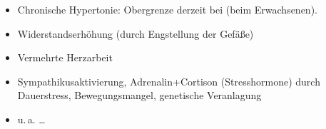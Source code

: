 \begin{itemize}
  \item Chronische Hypertonie: Obergrenze derzeit bei  (beim
  Erwachsenen).
\end{itemize}


{
\begin{itemize}
  \item Widerstandserhöhung (durch Engstellung der Gefäße)
  \item Vermehrte Herzarbeit
  \item Sympathikusaktivierung, Adrenalin+Cortison (Stresshormone) durch
  Dauerstress,  Bewegungsmangel, genetische Veranlagung
  \item u.\,a. \ldots
\end{itemize}

}{

}{}{}{}


